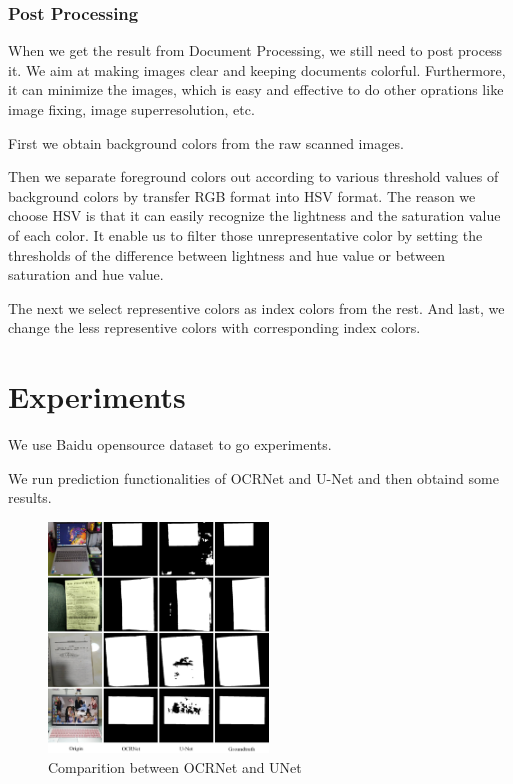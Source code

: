 \documentclass[10pt, conference, compsocconf]{IEEEtran}
\begin{document}
			\subsubsection{Post Processing}

			When we get the result from Document Processing, we still need to post process it. 
			We aim at making images clear and keeping documents colorful. 
			Furthermore, it can minimize the images, which is easy and effective to do other oprations like image fixing, image superresolution, etc.

			First we obtain background colors from the raw scanned images.
			
			Then we separate foreground colors out according to various threshold values of background colors by transfer RGB format into HSV format. 
			The reason we choose HSV is that it can easily recognize the lightness and the saturation value of each color. 
			It enable us to filter those unrepresentative color by setting the thresholds of the difference between lightness and hue value or between saturation and hue value. 

			The next we select representive colors as index colors from the rest. 
			And last, we change the less representive colors with corresponding index colors. 

	\section{Experiments}


	We use Baidu opensource dataset to go experiments. 

	We run prediction functionalities of OCRNet and U-Net and then obtaind some results. 

	\begin{figure}[!h]
		\centering
		\includegraphics[width=2.3in]{./Assets/final_whole_img.jpg}
		\caption{Comparition between OCRNet and UNet}
	\end{figure}
\end{document}
